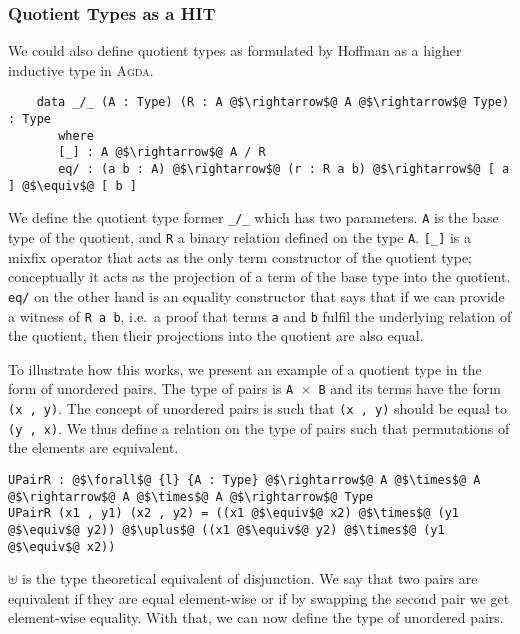 \documentclass[12pt,twoside,maitrise]{dms}
\theoremstyle{definition}
\numberwithin{equation}{section}
\numberwithin{table}{chapter}
\numberwithin{figure}{chapter}
\newcommand\id[1] {\texttt{#1}}
\newcommand\fn[1] {\texttt{#1}}
\def\Agda{\textsc{Agda}\xspace}
\begin{document}
\subsubsection{Quotient Types as a HIT}\label{subsec:quot-as-hit}

We could also define quotient types as formulated by
Hoffman\cite{hofmann1995extensional} as a higher inductive type in \Agda{}.

\begin{verbatim}
    data _/_ (A : Type) (R : A @$\rightarrow$@ A @$\rightarrow$@ Type) : Type
       where
       [_] : A @$\rightarrow$@ A / R
       eq/ : (a b : A) @$\rightarrow$@ (r : R a b) @$\rightarrow$@ [ a ] @$\equiv$@ [ b ]
\end{verbatim}

We define the quotient type former \fn{\_/\_} which has two parameters. \id{A}
is the base type of the quotient, and \id{R} a binary relation defined on the
type \id{A}. \fn{[\_]} is a mixfix operator that acts as the only term
constructor of the quotient type; conceptually it acts as the projection of a
term of the base type into the quotient. \fn{eq/} on the other hand is an
equality constructor that says that if we can provide a witness of \fn{R a b},
i.e.\ a proof that terms \id{a} and \id{b} fulfil the underlying relation of the
quotient, then their projections into the quotient are also equal.

To illustrate how this works, we present an example of a quotient type in the
form of unordered pairs. The type of pairs is \fn{A $\times$ B} and its terms
have the form \fn{(x , y)}. The concept of unordered pairs is such that \fn{(x ,
  y)} should be equal to \fn{(y , x)}. We thus define a relation on the type of
pairs such that permutations of the elements are equivalent.

\begin{verbatim}
UPairR : @$\forall$@ {l} {A : Type} @$\rightarrow$@ A @$\times$@ A @$\rightarrow$@ A @$\times$@ A @$\rightarrow$@ Type
UPairR (x1 , y1) (x2 , y2) = ((x1 @$\equiv$@ x2) @$\times$@ (y1 @$\equiv$@ y2)) @$\uplus$@ ((x1 @$\equiv$@ y2) @$\times$@ (y1 @$\equiv$@ x2))
\end{verbatim}

$\uplus$ is the type theoretical equivalent of disjunction. We say that two
pairs are equivalent if they are equal element-wise or if by swapping the second
pair we get element-wise equality. With that, we can now define the type of
unordered pairs.
\end{document}
